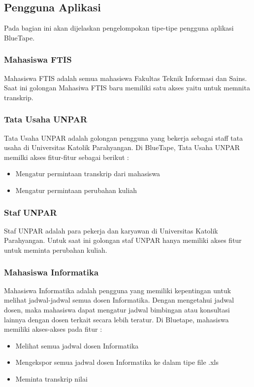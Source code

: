\subsection{Pengguna Aplikasi}
Pada bagian ini akan dijelaskan pengelompokan tipe-tipe pengguna aplikasi BlueTape.

\subsubsection{Mahasiswa FTIS}
Mahasiswa FTIS adalah semua mahasiswa Fakultas Teknik Informasi dan Sains. Saat ini golongan Mahasiwa FTIS baru memiliki satu akses yaitu untuk memnita transkrip.


\subsubsection{Tata Usaha UNPAR}
Tata Usaha UNPAR adalah golongan pengguna yang bekerja sebagai staff tata usaha di Universitas Katolik Parahyangan. Di BlueTape, Tata Usaha UNPAR memilki akses fitur-fitur sebagai berikut :
\begin{itemize}
	\item Mengatur permintaan transkrip dari mahasiswa
	\item Mengatur permintaan perubahan kuliah 
\end{itemize}

\subsubsection{Staf UNPAR}
Staf UNPAR adalah para pekerja dan karyawan di Universitas Katolik Parahyangan. Untuk saat ini golongan staf UNPAR hanya memiliki akses fitur untuk meminta perubahan kuliah.

\subsubsection{Mahasiswa Informatika}
Mahasiswa Informatika adalah pengguna yang memiliki kepentingan untuk melihat jadwal-jadwal semua dosen Informatika. Dengan mengetahui jadwal dosen, maka mahasiswa dapat mengatur jadwal bimbingan atau konsultasi lainnya dengan dosen terkait secara lebih teratur. Di Bluetape, mahasiswa memiliki akses-akses pada fitur :
\begin{itemize}
	\item Melihat semua jadwal dosen Informatika
	\item Mengekspor semua jadwal dosen Informatika ke dalam tipe file .xls
	\item Meminta transkrip nilai
\end{itemize}

